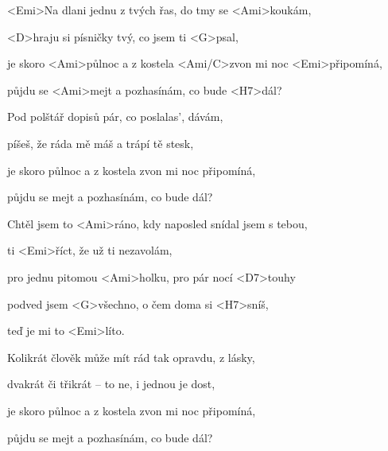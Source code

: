

\zs
<Emi>Na dlani jednu z tvých řas, do tmy se <Ami>koukám,

<D>hraju si písničky tvý, co jsem ti <G>psal,

je skoro <Ami>půlnoc a z kostela <Ami/C>zvon mi noc <Emi>připomíná,

půjdu se <Ami>mejt a pozhasínám, co bude <H7>dál?
\ks

\zs
Pod polštář dopisů pár, co poslalas', dávám,

píšeš, že ráda mě máš a trápí tě stesk,

je skoro půlnoc a z kostela zvon mi noc připomíná,

půjdu se mejt a pozhasínám, co bude dál?
\ks

\zr
Chtěl jsem to <Ami>ráno, kdy naposled snídal jsem s tebou,

ti <Emi>říct, že už ti nezavolám,

pro jednu pitomou <Ami>holku, pro pár nocí <D7>touhy

podved jsem <G>všechno, o čem doma si <H7>sníš,

teď je mi to <Emi>líto.
\kr

\zs
Kolikrát člověk může mít rád tak opravdu, z lásky,

dvakrát či třikrát -- to ne, i jednou je dost,

je skoro půlnoc a z kostela zvon mi noc připomíná,

půjdu se mejt a pozhasínám, co bude dál?
\ks


\zr \kr

\kp
